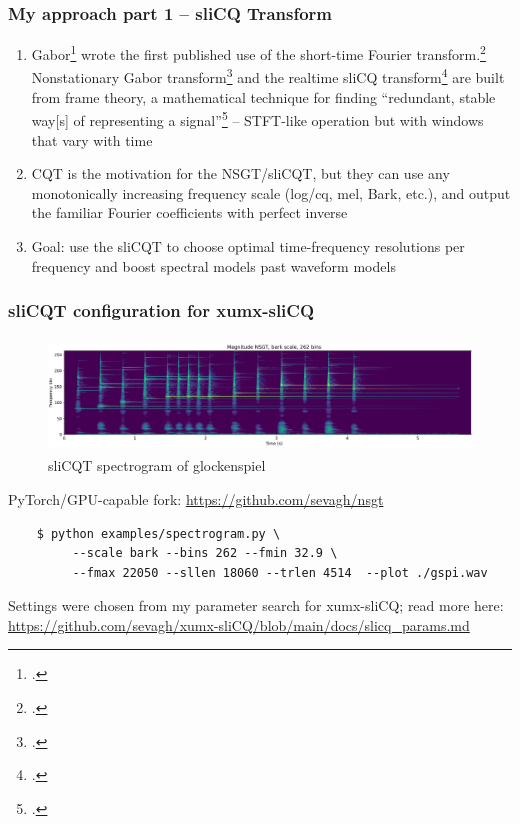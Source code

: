 \documentclass[usenames,dvipsnames]{beamer}
\begin{document}
\begin{frame}
	\frametitle{My approach part 1 -- sliCQ Transform}
	\begin{enumerate}
	\item
		Gabor\footcite{gabor1946} wrote the first published use of the short-time Fourier transform.\footcite{dictionary} Nonstationary Gabor transform\footcite{balazs} and the realtime sliCQ transform\footcite{invertiblecqt, slicq, variableq1} are built from frame theory, a mathematical technique for finding ``redundant, stable way[s] of representing a signal''\footcite{framesintro} -- STFT-like operation but with windows that vary with time
	\item
		CQT is the motivation for the NSGT/sliCQT, but they can use any monotonically increasing frequency scale (log/cq, mel, Bark, etc.), and output the familiar Fourier coefficients with perfect inverse
	\item
		Goal: use the sliCQT to choose optimal time-frequency resolutions per frequency and boost spectral models past waveform models
	\end{enumerate}
\end{frame}

\begin{frame}[fragile]
	\frametitle{sliCQT configuration for xumx-sliCQ}
	\begin{figure}[ht]
		\centering
		\includegraphics[height=3cm]{./images-gspi/gspi_xumx_slicq_params.png}
		\caption{sliCQT spectrogram of glockenspiel}
	\end{figure}
	PyTorch/GPU-capable fork: \url{https://github.com/sevagh/nsgt}
	\begin{verbatim}
	$ python examples/spectrogram.py \
		 --scale bark --bins 262 --fmin 32.9 \
		 --fmax 22050 --sllen 18060 --trlen 4514  --plot ./gspi.wav
	\end{verbatim}
	Settings were chosen from my parameter search for xumx-sliCQ; read more here: \url{https://github.com/sevagh/xumx-sliCQ/blob/main/docs/slicq_params.md}
\end{frame}
\end{document}
